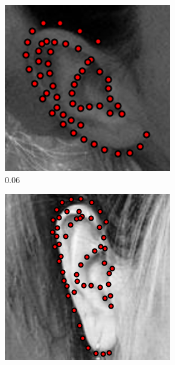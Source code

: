 \begin{figure}[h]
\centering
    \begin{subfigure}[b]{0.23\textwidth}
            \includegraphics[height=1\textwidth]{resources/Fig_Alignment/ear_06_55}
    \caption{$0.06$}
    \end{subfigure}
    \begin{subfigure}[b]{0.23\textwidth}
            \includegraphics[height=1\textwidth]{resources/Fig_Alignment/ear_1_55}

\end{subfigure}
\end{figure}
